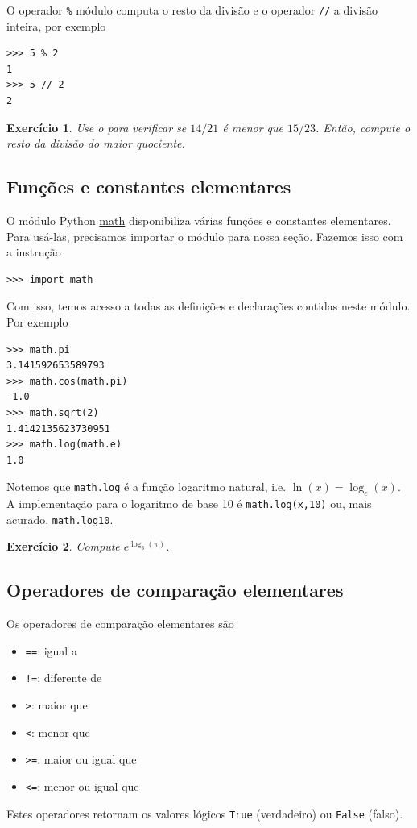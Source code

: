 \documentclass[12pt]{article}
\newtheorem{exr}{Exercício}[section]
\begin{document}
O operador \lstinline+%+ módulo computa o resto da divisão e o operador \lstinline+//+ a divisão inteira, por exemplo
\begin{lstlisting}
>>> 5 % 2
1
>>> 5 // 2
2
\end{lstlisting}

\begin{exr}
  Use o {\python} para verificar se $14/21$ é menor que $15/23$. Então, compute o resto da divisão do maior quociente.
\end{exr}

\subsection{Funções e constantes elementares}

O módulo Python \href{https://docs.python.org/3/library/math.html}{math} disponibiliza várias funções e constantes elementares. Para usá-las, precisamos importar o módulo para nossa seção. Fazemos isso com a instrução
\begin{lstlisting}
>>> import math
\end{lstlisting}
Com isso, temos acesso a todas as definições e declarações contidas neste módulo. Por exemplo
\begin{lstlisting}
>>> math.pi
3.141592653589793
>>> math.cos(math.pi)
-1.0
>>> math.sqrt(2)
1.4142135623730951
>>> math.log(math.e)
1.0
\end{lstlisting}

\begin{obs}
  Notemos que \lstinline+math.log+ é a função logaritmo natural, i.e. $\ln(x) = \log_e(x)$. A implementação {\python} para o logaritmo de base 10 é \lstinline+math.log(x,10)+ ou, mais acurado, \lstinline+math.log10+.
\end{obs}

\begin{exr}
  Compute $e^{\log_3(\pi)}$.
\end{exr}

\subsection{Operadores de comparação elementares}

Os operadores de comparação elementares são
\begin{itemize}
\item[]\lstinline+==+: igual a
\item[]\lstinline+!=+: diferente de
\item[]\lstinline+>+: maior que
\item[]\lstinline+<+: menor que
\item[]\lstinline+>=+: maior ou igual que
\item[]\lstinline+<=+: menor ou igual que
\end{itemize}
Estes operadores retornam os valores lógicos \lstinline+True+ (verdadeiro) ou \lstinline+False+ (falso).
\end{document}
